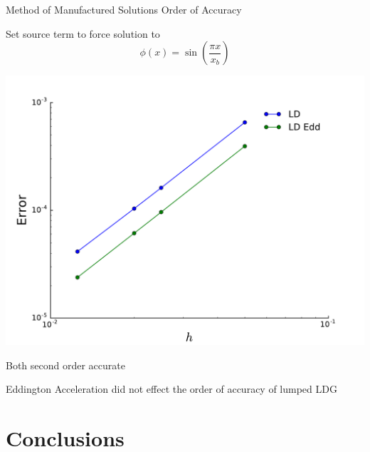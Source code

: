 \documentclass[10pt]{beamer}
\begin{document}
\begin{frame}{Method of Manufactured Solutions Order of Accuracy} 

	Set source term to force solution to 
	\begin{equation*}
		\phi(x) = \sin\left(\frac{\pi x}{x_b}\right)
	\end{equation*}

	\pause
	\centerline{\includegraphics[width=.5\paperwidth]{figs/ooa.pdf}}

	\pause
	Both second order accurate

	\pause
	Eddington Acceleration did not effect the order of accuracy of lumped LDG 

\end{frame}

\section{Conclusions}
\end{document}
